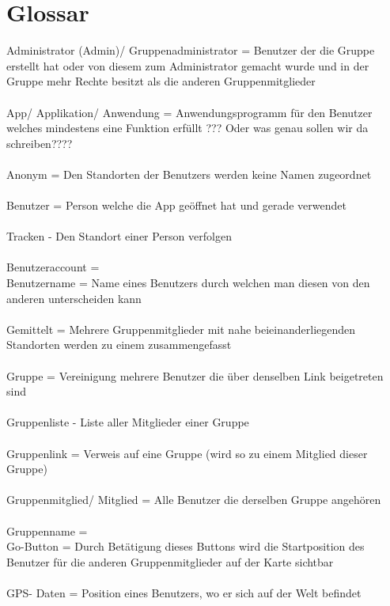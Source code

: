 \section{Glossar}

Administrator (Admin)/ Gruppenadministrator = Benutzer der die Gruppe erstellt hat oder von diesem zum Administrator gemacht wurde und in der Gruppe mehr Rechte besitzt als die anderen Gruppenmitglieder\\
\\
App/ Applikation/ Anwendung = Anwendungsprogramm für den Benutzer welches mindestens eine Funktion erfüllt ??? Oder was genau sollen wir da schreiben????\\
\\
Anonym = Den Standorten der Benutzers werden keine Namen zugeordnet\\
\\
Benutzer = Person welche die App geöffnet hat und gerade verwendet\\
\\
Tracken - Den Standort einer Person verfolgen\\
\\
Benutzeraccount =
\\
Benutzername = Name eines Benutzers durch welchen man diesen von den anderen unterscheiden kann\\
\\
Gemittelt = Mehrere Gruppenmitglieder mit nahe beieinanderliegenden Standorten werden zu einem zusammengefasst\\
\\
Gruppe = Vereinigung mehrere Benutzer die über denselben Link beigetreten sind\\
\\
Gruppenliste - Liste aller Mitglieder einer Gruppe\\
\\
Gruppenlink = Verweis auf eine Gruppe (wird so zu einem Mitglied dieser Gruppe)\\
\\
Gruppenmitglied/ Mitglied = Alle Benutzer die derselben Gruppe angehören\\
\\
Gruppenname =
\\
Go-Button = Durch Betätigung dieses Buttons wird die Startposition des Benutzer für die anderen Gruppenmitglieder auf der Karte sichtbar\\
\\
GPS- Daten = Position eines Benutzers, wo er sich auf der Welt befindet\\
